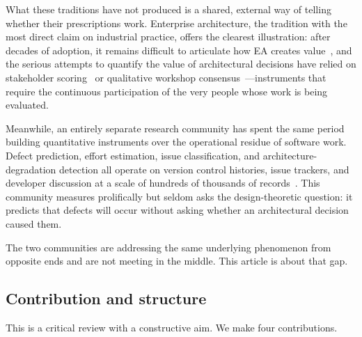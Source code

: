 \documentclass[11pt,a4paper]{article}
\begin{document}
What these traditions have not produced is a shared, external way of telling
whether their prescriptions work. Enterprise architecture, the tradition with
the most direct claim on industrial practice, offers the clearest illustration:
after decades of adoption, it remains difficult to articulate how EA creates
value~\citep{gong2019,saintlouis2017}, and the serious attempts to quantify the
value of architectural decisions have relied on stakeholder
scoring~\citep{moore2003} or qualitative workshop
consensus~\citep{nord2014}---instruments that require the continuous
participation of the very people whose work is being evaluated.

Meanwhile, an entirely separate research community has spent the same period
building quantitative instruments over the operational residue of software
work. Defect prediction, effort estimation, issue classification, and
architecture-degradation detection all operate on version control histories,
issue trackers, and developer discussion at a scale of hundreds of thousands of
records~\citep{aleti2013,tawosi2022,zangari2023,herold2020}. This community
measures prolifically but seldom asks the design-theoretic question: it predicts
that defects will occur without asking whether an architectural decision caused
them.

The two communities are addressing the same underlying phenomenon from opposite
ends and are not meeting in the middle. This article is about that gap.

\subsection{Contribution and structure}

This is a critical review with a constructive aim. We make four contributions.
\end{document}
